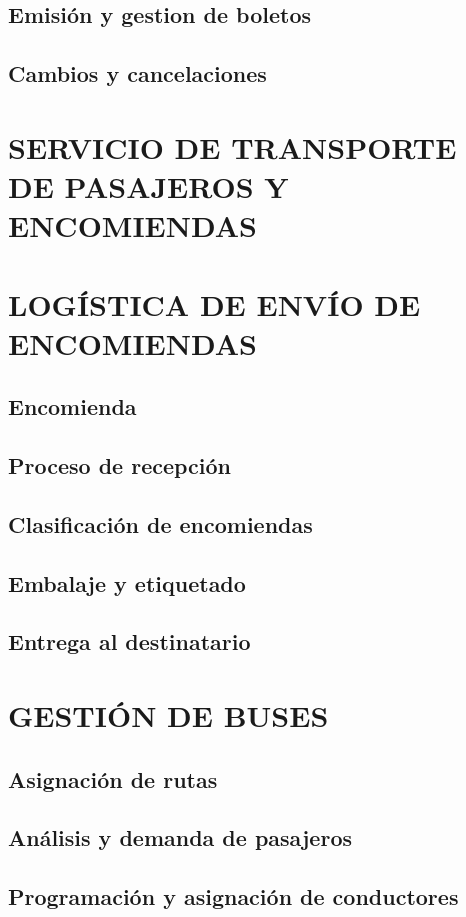 	\subsection{Emisión y gestion de boletos}
	\subsection{Cambios y cancelaciones}
	\section{SERVICIO DE TRANSPORTE DE PASAJEROS Y ENCOMIENDAS}
	\section{LOGÍSTICA DE ENVÍO DE ENCOMIENDAS}
	\subsection{Encomienda}
	\subsection{Proceso de recepción}
	\subsection{Clasificación de encomiendas}
	\subsection{Embalaje y etiquetado}
	\subsection{Entrega al destinatario}
	\section{GESTIÓN DE BUSES}
	\subsection{Asignación de rutas}
	\subsection{Análisis y demanda de pasajeros}
	\subsection{Programación y asignación de conductores}
	
